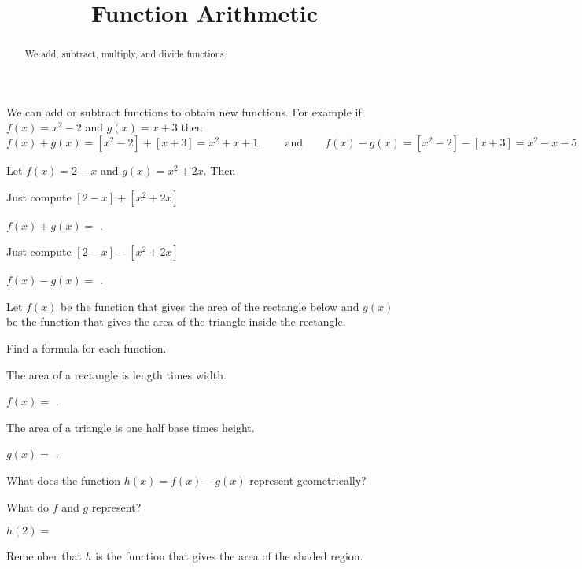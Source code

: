\documentclass{ximera}
\title{Function Arithmetic}
\begin{document}
\begin{abstract}
We add, subtract, multiply, and divide functions.
\end{abstract}
\maketitle


We can add or subtract functions to obtain new functions. For example if $f(x)=x^2-2$ and $g(x)=x+3$ then 
\[
f(x)+g(x)=[x^2-2]+[x+3]=x^2+x+1,\qquad\text{and}\qquad f(x)-g(x)=[x^2-2]-[x+3]=x^2-x-5
\]

\begin{question}
Let $f(x)=2-x$ and $g(x)=x^2+2x$. Then

\begin{hint}
Just compute $[2-x]+[x^2+2x]$
\end{hint}
$f(x)+g(x)=$ .

\begin{hint}
Just compute $[2-x]-[x^2+2x]$
\end{hint}
$f(x)-g(x)=$ .

\end{question}

\begin{question}
Let $f(x)$ be the function that gives the area of the rectangle below and $g(x)$ be the function that gives the area of the triangle inside the rectangle. 
\begin{image}
\end{image}

Find a formula for each function.


\begin{hint}
The area of a rectangle is length times width.
\end{hint}
$f(x)=$ .

\begin{hint}
The area of a triangle is one half base times height.
\end{hint}
$g(x)=$ .

What does the function $h(x)=f(x)-g(x)$ represent geometrically?
\begin{hint}
What do $f$ and $g$ represent? 
\end{hint}
\begin{multipleChoice}
\end{multipleChoice}

$h(2)=$ 
\begin{hint}
Remember that $h$ is the function that gives the area of the shaded region. 
\end{hint}
\end{question}
\end{document}
